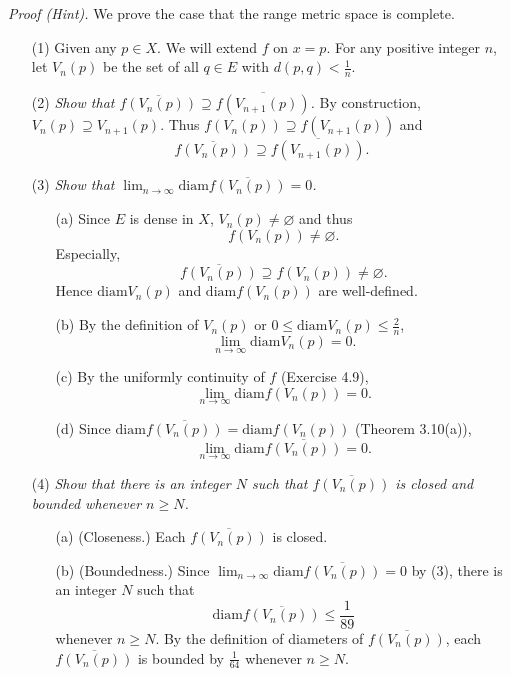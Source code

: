 \documentclass{article}
\begin{document}
\emph{Proof (Hint).}
We prove the case that the range metric space is complete.
\begin{enumerate}
\item[(1)]
Given any $p \in X$. We will extend $f$ on $x = p$.
For any positive integer $n$, let
$V_n(p)$ be the set of all $q \in E$ with $d(p,q) < \frac{1}{n}$.

\item[(2)]
\emph{Show that $\overline{f(V_n(p))} \supseteq \overline{f(V_{n+1}(p))}$.}
By construction, $V_n(p) \supseteq V_{n+1}(p)$.
Thus $f(V_n(p)) \supseteq f(V_{n+1}(p))$
and
\[
  \overline{f(V_n(p))} \supseteq \overline{f(V_{n+1}(p))}.
\]

\item[(3)]
\emph{Show that $\lim_{n \to \infty} \mathrm{diam} \overline{f(V_n(p))} = 0$.}
\begin{enumerate}
  \item[(a)]
  Since $E$ is dense in $X$, $V_n(p) \neq \varnothing$ and thus
  \[
    f(V_n(p)) \neq \varnothing.
  \]
  Especially,
  \[
    \overline{f(V_n(p))} \supseteq f(V_n(p)) \neq \varnothing.
  \]
  Hence $\mathrm{diam}V_n(p)$ and $\mathrm{diam}f(V_n(p))$
  are well-defined.

  \item[(b)]
  By the definition of $V_n(p)$ or $0 \leq \mathrm{diam}V_n(p) \leq \frac{2}{n}$,
  \[
    \lim_{n \to \infty} \mathrm{diam}V_n(p) = 0.
  \]

  \item[(c)]
  By the uniformly continuity of $f$ (Exercise 4.9),
  \[
    \lim_{n \to \infty} \mathrm{diam}f(V_n(p)) = 0.
  \]

  \item[(d)]
  Since $\mathrm{diam} \overline{f(V_n(p))} = \mathrm{diam}f(V_n(p))$ (Theorem 3.10(a)),
  \[
    \lim_{n \to \infty} \mathrm{diam} \overline{f(V_n(p))} = 0.
  \]
\end{enumerate}

\item[(4)]
\emph{Show that there is an integer $N$ such that
$\overline{f(V_n(p))}$ is closed and bounded whenever $n \geq N$.}
\begin{enumerate}
  \item[(a)]
  (Closeness.)
  Each $\overline{f(V_n(p))}$ is closed.

  \item[(b)]
  (Boundedness.)
  Since $\lim_{n \to \infty} \mathrm{diam} \overline{f(V_n(p))} = 0$ by (3),
  there is an integer $N$ such that
  \[
    \mathrm{diam} \overline{f(V_n(p))} \leq \frac{1}{89}
  \]
  whenever $n \geq N$.
  By the definition of diameters of $\overline{f(V_n(p))}$,
  each $\overline{f(V_n(p))}$ is bounded by $\frac{1}{64}$ whenever $n \geq N$.


\end{enumerate}
\end{enumerate}
\end{document}
